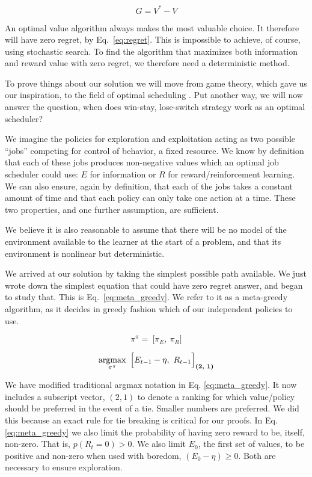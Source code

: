 \begin{equation}
\label{eq:regret}
	G = V^* - V
\end{equation}

An optimal value algorithm always makes the most valuable choice. It therefore will have zero regret, by Eq.~\ref{eq:regret}. This is impossible to achieve, of course, using stochastic search. To find the algorithm that maximizes both information and reward value with zero regret, we therefore need a deterministic method. 

To prove things about our solution we will move from game theory, which gave us our inspiration, to the field of optimal scheduling \citep{Bellmann1954,Roughgarden2019}. Put another way, we will now answer the question, when does win-stay, lose-switch strategy work as an optimal scheduler? 

We imagine the policies for exploration and exploitation acting as two possible ``jobs'' competing for control of behavior, a fixed resource. We know by definition that each of these jobs produces non-negative values which an optimal job scheduler could use: $E$ for information or $R$ for reward/reinforcement learning. We can also ensure, again by definition, that each of the jobs takes a constant amount of time and that each policy can only take one action at a time. These two properties, and one further assumption, are sufficient.

We believe it is also reasonable to assume that there will be no model of the environment available to the learner at the start of a problem, and that its environment is nonlinear but deterministic. 

We arrived at our solution by taking the simplest possible path available. We just wrote down the simplest equation that could have zero regret answer, and began to study that. This is Eq.~\ref{eq:meta_greedy}. We refer to it as a meta-greedy algorithm, as it decides in greedy fashion which of our independent policies to use.

\begin{equation}
\label{eq:pipi} 
\pi^{\pi} = \ \Big [ \pi_E,\ \pi_R \Big ]
\end{equation}

\begin{equation}
\label{eq:meta_greedy} 
	\operatorname*{argmax}_{\pi^{\pi}} \ \Big [ E_{t-1} - \eta,\ R_{t-1} \Big ]_{\textbf{(2, 1)}}
\end{equation}
	
We have modified traditional argmax notation in Eq. \ref{eq:meta_greedy}. It now includes a subscript vector, $(2,1)$ to denote a ranking for which value/policy should be preferred in the event of a tie. Smaller numbers are preferred. We did this because an exact rule for tie breaking is critical for our proofs. In Eq. \ref{eq:meta_greedy} we also limit the probability of having zero reward to be, itself, non-zero. That is, $p(R_t=0) > 0$. We also limit $E_0$, the first set of values, to be positive and non-zero when used with boredom, $(E_0 - \eta) \geq 0$. Both are necessary to ensure exploration. 

